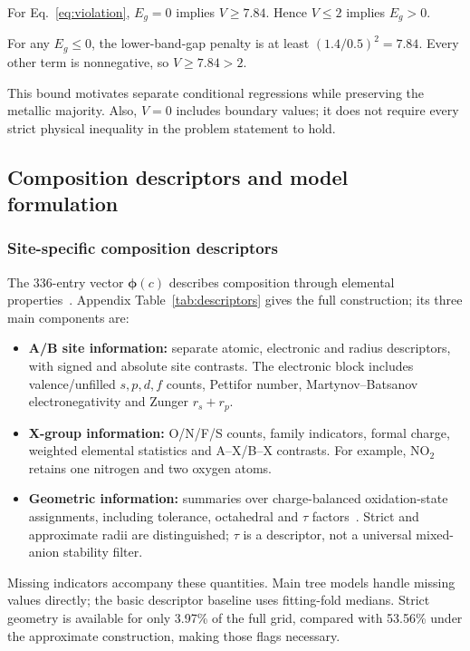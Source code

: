 \begin{proposition}\label{prop:metal}
For Eq.~\eqref{eq:violation}, $E_g=0$ implies $V\ge7.84$. Hence $V\le2$ implies $E_g>0$.
\end{proposition}
\begin{p1proof}
For any $E_g\le0$, the lower-band-gap penalty is at least $(1.4/0.5)^2=7.84$. Every other term is nonnegative, so $V\ge7.84>2$.
\end{p1proof}

This bound motivates separate conditional regressions while preserving the metallic majority. Also, $V=0$ includes boundary values; it does not require every strict physical inequality in the problem statement to hold.

\subsection{Composition descriptors and model formulation}
\subsubsection{Site-specific composition descriptors}
The 336-entry vector $\boldsymbol\phi(c)$ describes composition through elemental properties~\cite{ward2016}. Appendix Table~\ref{tab:descriptors} gives the full construction; its three main components are:
\begin{itemize}
  \item \textbf{A/B site information:} separate atomic, electronic and radius descriptors, with signed and absolute site contrasts. The electronic block includes valence/unfilled $s,p,d,f$ counts, Pettifor number, Martynov--Batsanov electronegativity and Zunger $r_s+r_p$.
  \item \textbf{X-group information:} O/N/F/S counts, family indicators, formal charge, weighted elemental statistics and A--X/B--X contrasts. For example, $\mathrm{NO_2}$ retains one nitrogen and two oxygen atoms.
  \item \textbf{Geometric information:} summaries over charge-balanced oxidation-state assignments, including tolerance, octahedral and $\tau$ factors~\cite{bartel2019}. Strict and approximate radii are distinguished; $\tau$ is a descriptor, not a universal mixed-anion stability filter.
\end{itemize}

Missing indicators accompany these quantities. Main tree models handle missing values directly; the basic descriptor baseline uses fitting-fold medians. Strict geometry is available for only 3.97\% of the full grid, compared with 53.56\% under the approximate construction, making those flags necessary.

